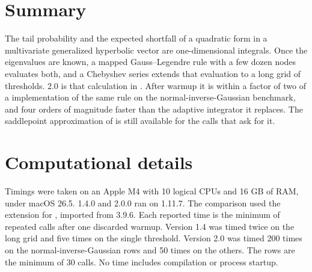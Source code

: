 \documentclass[article]{jss}
\begin{document}
\section{Summary} \label{sec:summary}

The tail probability and the expected shortfall of a quadratic form in a multivariate generalized hyperbolic vector are one-dimensional integrals.
Once the eigenvalues are known, a mapped Gauss--Legendre rule with a few dozen nodes evaluates both, and a Chebyshev series extends that evaluation to a long grid of thresholds.
 2.0 is that calculation in .
After warmup it is within a factor of two of a  implementation of the same rule on the normal-inverse-Gaussian benchmark, and four orders of magnitude faster than the adaptive integrator it replaces.
The saddlepoint approximation of \citet{bz:21} is still available for the calls that ask for it.

\section*{Computational details}

Timings were taken on an Apple M4 with 10 logical CPUs and 16 GB of RAM, under macOS 26.5.
 1.4.0 and 2.0.0 ran on  1.11.7.
The  comparison used the  extension for , imported from  3.9.6.
Each reported time is the minimum of repeated calls after one discarded warmup.
Version 1.4 was timed twice on the long grid and five times on the single threshold.
Version 2.0 was timed 200 times on the normal-inverse-Gaussian rows and 50 times on the others.
The  rows are the minimum of 30 calls.
No time includes compilation or process startup.


\end{document}
